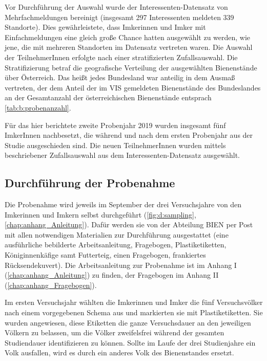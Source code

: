 Vor Durchführung der Auswahl wurde der Interessenten-Datensatz von Mehrfachmeldungen bereinigt (insgesamt 297 Interessenten meldeten 339 Standorte). Dies gewährleistete, dass Imkerinnen und Imker mit Einfachmeldungen eine gleich große Chance hatten ausgewählt zu werden, wie jene, die mit mehreren Standorten im Datensatz vertreten waren. Die Auswahl der TeilnehmerInnen erfolgte nach einer stratifizierten Zufallsauswahl. Die Stratifizierung betraf die geografische Verteilung der ausgewählten Bienenstände über Österreich. Das heißt jedes Bundesland war anteilig in dem Ausmaß vertreten, der dem Anteil der im VIS gemeldeten Bienenstände des Bundeslandes an der Gesamtanzahl der österreichischen Bienenstände entsprach \cref{tab:b:probenanzahl}.

Für das hier berichtete zweite Probenjahr 2019 wurden insgesamt fünf ImkerInnen nachbesetzt, die während und nach dem ersten Probenjahr aus der Studie ausgeschieden sind. Die neuen TeilnehmerInnen wurden mittels beschriebener Zufallsauswahl aus dem Interessenten-Datensatz ausgewählt.



\subsection{Durchführung der Probenahme} \label{chap:probenahme}

Die Probenahme wird jeweils im September der drei Versuchsjahre von den Imkerinnen und Imkern selbst durchgeführt (\cref{fig:d:sampling}, \cref{chap:anhang_Anleitung}). Dafür werden sie von der Abteilung BIEN per Post mit allen notwendigen Materialien zur Durchführung ausgestattet (eine ausführliche bebilderte Arbeitsanleitung, Fragebogen, Plastiketiketten, Königinnenkäfige samt Futterteig, einen Fragebogen, frankiertes Rücksendekuvert). Die Arbeitsanleitung zur Probenahme ist im Anhang I (\cref{chap:anhang_Anleitung}) zu finden, der Fragebogen im Anhang II (\cref{chap:anhang_Fragebogen}).

Im ersten Versuchsjahr wählten die Imkerinnen und Imker die fünf Versuchsvölker nach einem vorgegebenen Schema aus und markierten sie mit Plastiketiketten. Sie wurden angewiesen, diese Etiketten die ganze Versuchsdauer an den jeweiligen Völkern zu belassen, um die Völker zweifelsfrei während der gesamten Studiendauer identifizieren zu können. Sollte im Laufe der drei Studienjahre ein Volk ausfallen, wird es durch ein anderes Volk des Bienenstandes ersetzt.

